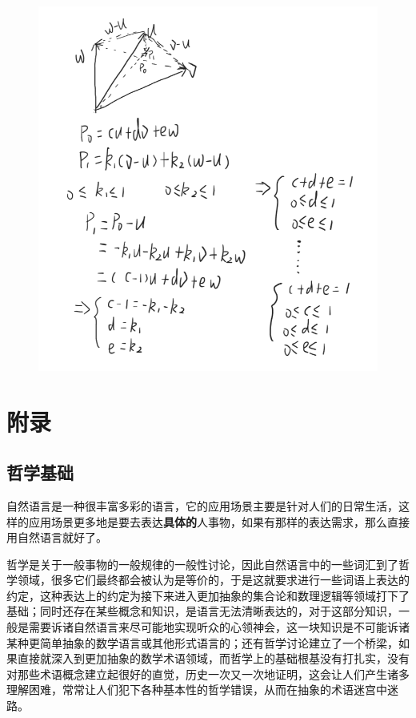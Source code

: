 \documentclass[12pt,oneside]{book}
\begin{document}
\begin{figure}[H]
\centering
\includegraphics[width=\linewidth ,totalheight=0.95\textheight , keepaspectratio]{线性代数引论问题集1_1_20.png}
\end{figure}






\appendix

\part{附录}
\chapter{哲学基础}
自然语言是一种很丰富多彩的语言，它的应用场景主要是针对人们的日常生活，这样的应用场景更多地是要去表达\textbf{具体的}人事物，如果有那样的表达需求，那么直接用自然语言就好了。

哲学是关于一般事物的一般规律的一般性讨论，因此自然语言中的一些词汇到了哲学领域，很多它们最终都会被认为是等价的，于是这就要求进行一些词语上表达的约定，这种表达上的约定为接下来进入更加抽象的集合论和数理逻辑等领域打下了基础；同时还存在某些概念和知识，是语言无法清晰表达的，对于这部分知识，一般是需要诉诸自然语言来尽可能地实现听众的心领神会，这一块知识是不可能诉诸某种更简单抽象的数学语言或其他形式语言的；还有哲学讨论建立了一个桥梁，如果直接就深入到更加抽象的数学术语领域，而哲学上的基础根基没有打扎实，没有对那些术语概念建立起很好的直觉，历史一次又一次地证明，这会让人们产生诸多理解困难，常常让人们犯下各种基本性的哲学错误，从而在抽象的术语迷宫中迷路。
\end{document}
